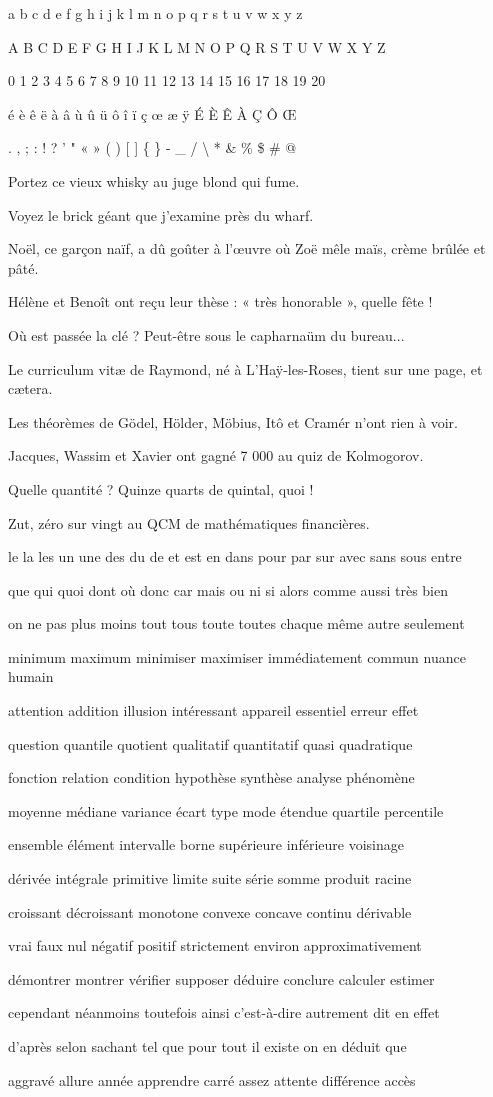 \documentclass[11pt]{article}
\makeatletter
\newcommand{\aecrire}[1]{\par\noindent\begin{minipage}{\linewidth}\raggedright #1\end{minipage}\par\vspace{2pt}{\color{fiche@roseclair}\rule{\linewidth}{.6pt}}\par\vspace{5pt}}
\makeatother
\begin{document}
\aecrire{a b c d e f g h i j k l m n o p q r s t u v w x y z}
\aecrire{A B C D E F G H I J K L M N O P Q R S T U V W X Y Z}
\aecrire{0 1 2 3 4 5 6 7 8 9 10 11 12 13 14 15 16 17 18 19 20}
\aecrire{é è ê ë à â ù û ü ô î ï ç œ æ ÿ É È Ê À Ç Ô Œ}
\aecrire{. , ; : ! ? ' " « » ( ) [ ] \{ \} - \_ / \textbackslash{} * \& \% \texteuro{} \$ \# @}
\aecrire{Portez ce vieux whisky au juge blond qui fume.}
\aecrire{Voyez le brick géant que j'examine près du wharf.}
\aecrire{Noël, ce garçon naïf, a dû goûter à l'œuvre où Zoë mêle maïs, crème brûlée et pâté.}
\aecrire{Hélène et Benoît ont reçu leur thèse : « très honorable », quelle fête !}
\aecrire{Où est passée la clé ? Peut-être sous le capharnaüm du bureau...}
\aecrire{Le curriculum vitæ de Raymond, né à L'Haÿ-les-Roses, tient sur une page, et cætera.}
\aecrire{Les théorèmes de Gödel, Hölder, Möbius, Itô et Cramér n'ont rien à voir.}
\aecrire{Jacques, Wassim et Xavier ont gagné 7 000 \texteuro{} au quiz de Kolmogorov.}
\aecrire{Quelle quantité ? Quinze quarts de quintal, quoi !}
\aecrire{Zut, zéro sur vingt au QCM de mathématiques financières.}

\clearpage
{}

\aecrire{le la les un une des du de et est en dans pour par sur avec sans sous entre}
\aecrire{que qui quoi dont où donc car mais ou ni si alors comme aussi très bien}
\aecrire{on ne pas plus moins tout tous toute toutes chaque même autre seulement}
\aecrire{minimum maximum minimiser maximiser immédiatement commun nuance humain}
\aecrire{attention addition illusion intéressant appareil essentiel erreur effet}
\aecrire{question quantile quotient qualitatif quantitatif quasi quadratique}
\aecrire{fonction relation condition hypothèse synthèse analyse phénomène}
\aecrire{moyenne médiane variance écart type mode étendue quartile percentile}
\aecrire{ensemble élément intervalle borne supérieure inférieure voisinage}
\aecrire{dérivée intégrale primitive limite suite série somme produit racine}
\aecrire{croissant décroissant monotone convexe concave continu dérivable}
\aecrire{vrai faux nul négatif positif strictement environ approximativement}
\aecrire{démontrer montrer vérifier supposer déduire conclure calculer estimer}
\aecrire{cependant néanmoins toutefois ainsi c'est-à-dire autrement dit en effet}
\aecrire{d'après selon sachant tel que pour tout il existe on en déduit que}
\aecrire{aggravé allure année apprendre carré assez attente différence accès}

\clearpage
{}
\end{document}
